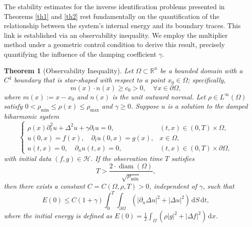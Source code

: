 \documentclass[12pt,reqno]{amsart}
\newtheorem{theo}{Theorem}[section]
\numberwithin{equation}{section}
\begin{document}
	The stability estimates for the inverse identification problems presented in Theorems \ref{th1} and \ref{th2} rest fundamentally on the quantification of the relationship between the system's internal energy and its boundary traces. This link is established via an observability inequality. We employ the multiplier method under a geometric control condition to derive this result, precisely quantifying the influence of the damping coefficient $\gamma$.
	
	\begin{theo}[Observability Inequality]\label{th4}
		Let $\Omega \subset \mathbb{R}^n$ be a bounded domain with a $C^4$ boundary that is star-shaped with respect to a point $x_0 \in \Omega$; specifically,
		\begin{equation}\label{eq:star_shaped}
			m(x) \cdot n(x) \geq c_0 > 0, \quad \forall x \in \partial\Omega,
		\end{equation}
		where $m(x) := x - x_0$ and $n(x)$ is the unit outward normal. Let $\rho \in L^\infty(\Omega)$ satisfy $0 < \rho_{\min} \le \rho(x) \le \rho_{\max}$ and $\gamma \ge 0$. Suppose $u$ is a solution to the damped biharmonic system
		\begin{equation}\label{eq:system_observability}
			\begin{cases}
				\rho(x)\partial_t^2 u + \Delta^2 u + \gamma\partial_t u = 0, & (t, x) \in (0, T) \times \Omega, \\
				u(0, x) = f(x), \quad \partial_t u(0, x) = g(x), & x \in \Omega, \\
				u(t, x) = 0, \quad \partial_{n} u (t, x) = 0, & (t, x) \in (0, T) \times \partial\Omega,
			\end{cases}
		\end{equation}
		with initial data $(f, g) \in \mathcal{H}$. If the observation time $T$ satisfies
		\begin{equation}\label{eq:time_condition}
			T > \frac{2 \cdot \operatorname{diam}(\Omega)}{\sqrt{\rho_{\min}}},
		\end{equation}
		then there exists a constant $C = C(\Omega, \rho, T) > 0$, independent of $\gamma$, such that
		\begin{equation*}\label{eq:observability_ineq}
			E(0) \leq C(1+\gamma) \int_{0}^{T} \int_{\partial\Omega} \left( \left| \partial_n \Delta u \right|^2 + |\Delta u|^2 \right) \, \mathrm{d}S \, \mathrm{d}t,
		\end{equation*}
		where the initial energy is defined as $E(0) = \frac{1}{2} \int_\Omega ( \rho|g|^2 + |\Delta f|^2 ) \, \mathrm{d}x$.
	\end{theo}
	
\end{document}
